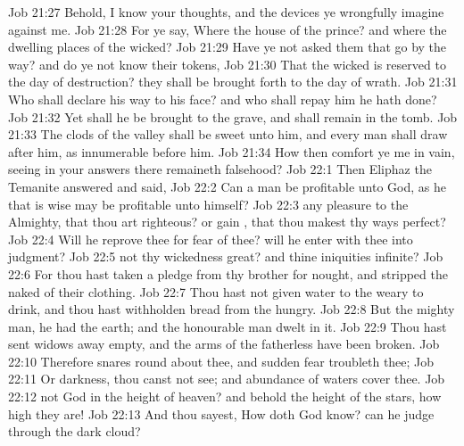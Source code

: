 \vs Job 21:27 Behold, I know your thoughts, and the devices  ye wrongfully imagine against me.
\vs Job 21:28 For ye say, Where  the house of the prince? and where  the dwelling places of the wicked?
\vs Job 21:29 Have ye not asked them that go by the way? and do ye not know their tokens,
\vs Job 21:30 That the wicked is reserved to the day of destruction? they shall be brought forth to the day of wrath.
\vs Job 21:31 Who shall declare his way to his face? and who shall repay him  he hath done?
\vs Job 21:32 Yet shall he be brought to the grave, and shall remain in the tomb.
\vs Job 21:33 The clods of the valley shall be sweet unto him, and every man shall draw after him, as  innumerable before him.
\vs Job 21:34 How then comfort ye me in vain, seeing in your answers there remaineth falsehood?
\vs Job 22:1 Then Eliphaz the Temanite answered and said,
\vs Job 22:2 Can a man be profitable unto God, as he that is wise may be profitable unto himself?
\vs Job 22:3  any pleasure to the Almighty, that thou art righteous? or  gain , that thou makest thy ways perfect?
\vs Job 22:4 Will he reprove thee for fear of thee? will he enter with thee into judgment?
\vs Job 22:5  not thy wickedness great? and thine iniquities infinite?
\vs Job 22:6 For thou hast taken a pledge from thy brother for nought, and stripped the naked of their clothing.
\vs Job 22:7 Thou hast not given water to the weary to drink, and thou hast withholden bread from the hungry.
\vs Job 22:8 But  the mighty man, he had the earth; and the honourable man dwelt in it.
\vs Job 22:9 Thou hast sent widows away empty, and the arms of the fatherless have been broken.
\vs Job 22:10 Therefore snares  round about thee, and sudden fear troubleth thee;
\vs Job 22:11 Or darkness,  thou canst not see; and abundance of waters cover thee.
\vs Job 22:12  not God in the height of heaven? and behold the height of the stars, how high they are!
\vs Job 22:13 And thou sayest, How doth God know? can he judge through the dark cloud?
